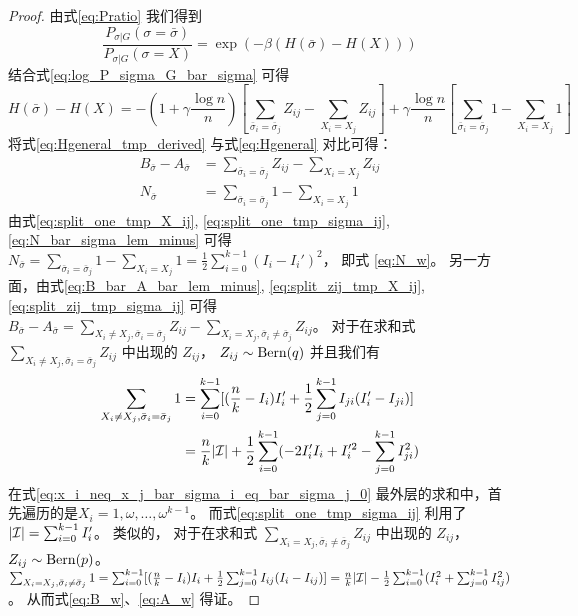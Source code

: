 \begin{proof}
  由式\eqref{eq:Pratio} 我们得到
  \begin{equation}
    \frac{P_{\sigma |G } (\sigma = \bar{\sigma})}
    {P_{\sigma |G } (\sigma = X)}
    = \exp(-\beta(H(\bar{\sigma})
    - H(X)))
  \end{equation}
  结合式\eqref{eq:log_P_sigma_G_bar_sigma}
  可得
  \begin{equation}\label{eq:Hgeneral_tmp_derived}
    H(\bar{\sigma}) - H(X)=
    -\left(1 + \gamma \frac{ \log n}{n}
    \right)
    \left[
      \sum_{\bar{\sigma}_i = \bar{\sigma}_j}Z_{ij} - \sum_{X_i = X_j}Z_{ij}
      \right]
    + \gamma\frac{ \log n}{n}
    \left[\sum_{\bar{\sigma}_i = \bar{\sigma}_j}1 - \sum_{X_i = X_j}1
    \right]
    \end{equation}
  将式\eqref{eq:Hgeneral_tmp_derived} 与式\eqref{eq:Hgeneral}
  对比可得：
  \begin{align}
    B_{\bar{\sigma}} - A_{\bar{\sigma}} &=
    \sum_{\bar{\sigma}_i = \bar{\sigma}_j}Z_{ij}
    - \sum_{X_i = X_j}Z_{ij}
    \label{eq:B_bar_A_bar_lem_minus}\\
    N_{\bar{\sigma}} &=
    \sum_{\bar{\sigma}_i = \bar{\sigma}_j} 1  -\sum_{X_i = X_j} 1
    \label{eq:N_bar_sigma_lem_minus}
  \end{align}
  由式\eqref{eq:split_one_tmp_X_ij},
  \eqref{eq:split_one_tmp_sigma_ij}, 
  \eqref{eq:N_bar_sigma_lem_minus} 可得
  $N_{\bar{\sigma}} = \sum_{\bar{\sigma}_i = \bar{\sigma}_j} 1  -\sum_{X_i = X_j} 1 = \frac{1}{2}\sum_{i=0}^{k-1} (I_i - I_i')^2 $，
  即式 \eqref{eq:N_w}。
	另一方面，由式\eqref{eq:B_bar_A_bar_lem_minus},
  \eqref{eq:split_zij_tmp_X_ij}, 
  \eqref{eq:split_zij_tmp_sigma_ij}
  可得 $B_{\bar{\sigma}} - A_{\bar{\sigma}} = \sum_{X_i \neq X_j, \bar{\sigma}_i = \bar{\sigma}_j} Z_{ij} - \sum_{X_i = X_j, \bar{\sigma}_i \neq \bar{\sigma}_j} Z_{ij}$。
	对于在求和式 $\sum_{X_i \neq X_j, \bar{\sigma}_i = \bar{\sigma}_j} Z_{ij}$
  中出现的 $Z_{ij}$， $Z_{ij} \sim \operatorname{Bern}(q)$
  并且我们有
  \begin{align}
  \sum_{X_i \neq X_j, \bar{\sigma}_i = \bar{\sigma}_j} 1 
  &= \sum_{i=0}^{k-1}[(\frac{n}{k} - I_i) I_i' + \frac{1}{2} \sum_{j=0}^{k-1} I_{ji}(I'_i - I_{ji}) ] 
  \label{eq:x_i_neq_x_j_bar_sigma_i_eq_bar_sigma_j_0}\\
	&=\frac{n}{k}|\mathcal{I}| + \frac{1}{2}\sum_{i=0}^{k-1}  (-2 I'_i I_i  + I'^2_i - \sum_{j=0}^{k-1} I^2_{ji}) 
  \label{eq:x_i_neq_x_j_bar_sigma_i_eq_bar_sigma_j_1}
  \end{align}
  在式\eqref{eq:x_i_neq_x_j_bar_sigma_i_eq_bar_sigma_j_0}
  最外层的求和中，首先遍历的是$X_i=1, \omega, \dots, \omega^{k-1}$。  
  而式\eqref{eq:split_one_tmp_sigma_ij}
  利用了
  $|\mathcal{I}| = \sum_{i=0}^{k-1} I'_i$。
  类似的，
  对于在求和式 $\sum_{X_i = X_j, \bar{\sigma}_i \neq \bar{\sigma}_j} Z_{ij}$
  中出现的 $Z_{ij}$， $Z_{ij} \sim \operatorname{Bern}(p)$。
	$\sum_{X_i = X_j, \bar{\sigma}_i \neq \bar{\sigma}_j} 1
	= \sum_{i=0}^{k-1}[(\frac{n}{k} - I_i) I_i + \frac{1}{2} \sum_{j=0}^{k-1} I_{ij}(I_i - I_{ij}) ] 
	= \frac{n}{k}|\mathcal{I}| - \frac{1}{2}\sum_{i=0}^{k-1}  (I^2_i + \sum_{j=0}^{k-1} I^2_{ij})$。
  从而式\eqref{eq:B_w}、\eqref{eq:A_w} 得证。
\end{proof}

